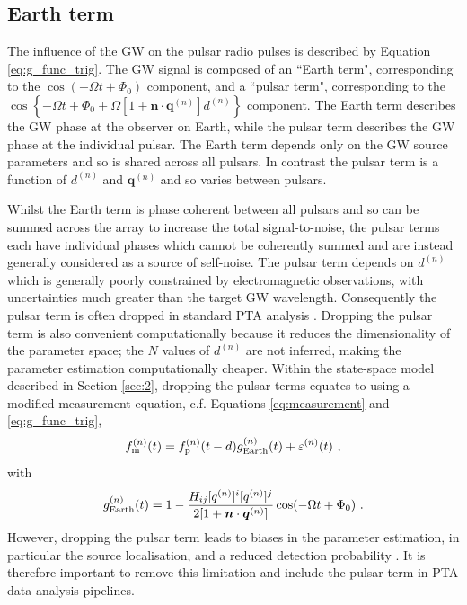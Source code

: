 \documentclass[fleqn,usenatbib,useAMS]{mnras}
\begin{document}
\subsection{Earth term}\label{sec:earth_term}
The influence of the GW on the pulsar radio pulses is described by Equation \eqref{eq:g_func_trig}. The GW signal is composed of an ``Earth term", corresponding to the $\cos(-\Omega t + \Phi_0)$ component, and a ``pulsar term", corresponding to the $\cos \left \{-\Omega t +\Phi_0 + \Omega \left[1 + \boldsymbol{n}\cdot \boldsymbol{q}^{(n)} \right]  d^{(n)} \right \}$ component. The Earth term describes the GW phase at the observer on Earth, while the pulsar term describes the GW phase at the individual pulsar. The Earth term depends only on the GW source parameters and so is shared across all pulsars. In contrast the pulsar term is a function of $d^{(n)}$ and $\boldsymbol{q}^{(n)}$ and so varies between pulsars. \newline 


Whilst the Earth term is phase coherent between all pulsars and so can be summed across the array to increase the total signal-to-noise, the pulsar terms each have individual phases which cannot be coherently summed and are instead generally considered as a source of self-noise. The pulsar term depends on $d^{(n)}$ which is generally poorly constrained by electromagnetic observations, with uncertainties much greater than the target GW wavelength. Consequently the pulsar term is often dropped in standard PTA analysis \citep[e.g.][]{Sesana2010,Babak2012,Petiteau2013,Zhu2015,Taylors2016,Goldstein2018,Charisi2023arXiv230403786C}. Dropping the pulsar term is also convenient computationally because it reduces the dimensionality of the parameter space; the $N$ values of $d^{(n)}$ are not inferred, making the parameter estimation computationally cheaper. Within the state-space model described in Section \ref{sec:2}, dropping the pulsar terms equates to using a modified measurement equation, c.f. Equations \eqref{eq:measurement} and \eqref{eq:g_func_trig},
\begin{equation}
	f_{\rm m}^{(n)}(t) = f_{\rm p}^{(n)}(t-d) g^{(n)}_{\rm Earth}(t) + \varepsilon^{(n)}(t) \ , 
	\label{eq:measuremen_earth}
\end{equation}
with
\begin{equation}
	g^{(n)}_{\rm Earth}(t) = 1 - \frac{ H_{ij}[q^{(n)}]^i [q^{(n)}]^j}{2[1 + \boldsymbol{n}\cdot \boldsymbol{q}^{(n)}] }  \cos(-\Omega t +\Phi_0)  \ .
	\label{eq:g_func_trig_earth}
\end{equation}
However, dropping the pulsar term leads to biases in the parameter estimation, in particular the source localisation, and a reduced detection probability \citep{Zhupulsarterms,Chen2022,KimpsonPTA}. It is therefore important to remove this limitation and include the pulsar term in PTA data analysis pipelines.
\end{document}
